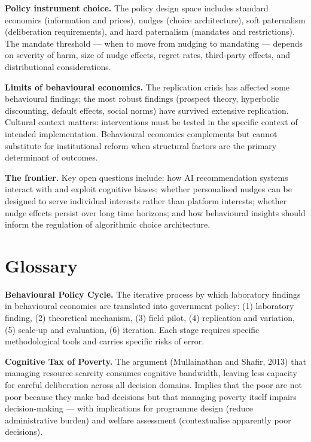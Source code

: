 \documentclass[12pt, letterpaper]{article}
\begin{document}
\textbf{Policy instrument choice.} The policy design space includes standard economics (information and prices), nudges (choice architecture), soft paternalism (deliberation requirements), and hard paternalism (mandates and restrictions). The mandate threshold --- when to move from nudging to mandating --- depends on severity of harm, size of nudge effects, regret rates, third-party effects, and distributional considerations.

\textbf{Limits of behavioural economics.} The replication crisis has affected some behavioural findings; the most robust findings (prospect theory, hyperbolic discounting, default effects, social norms) have survived extensive replication. Cultural context matters: interventions must be tested in the specific context of intended implementation. Behavioural economics complements but cannot substitute for institutional reform when structural factors are the primary determinant of outcomes.

\textbf{The frontier.} Key open questions include: how AI recommendation systems interact with and exploit cognitive biases; whether personalised nudges can be designed to serve individual interests rather than platform interests; whether nudge effects persist over long time horizons; and how behavioural insights should inform the regulation of algorithmic choice architecture.

\medskip


\section*{Glossary}


\textbf{Behavioural Policy Cycle.} The iterative process by which laboratory findings in behavioural economics are translated into government policy: (1) laboratory finding, (2) theoretical mechanism, (3) field pilot, (4) replication and variation, (5) scale-up and evaluation, (6) iteration. Each stage requires specific methodological tools and carries specific risks of error.

\textbf{Cognitive Tax of Poverty.} The argument (Mullainathan and Shafir, 2013) that managing resource scarcity consumes cognitive bandwidth, leaving less capacity for careful deliberation across all decision domains. Implies that the poor are not poor because they make bad decisions but that managing poverty itself impairs decision-making --- with implications for programme design (reduce administrative burden) and welfare assessment (contextualise apparently poor decisions).
\end{document}
